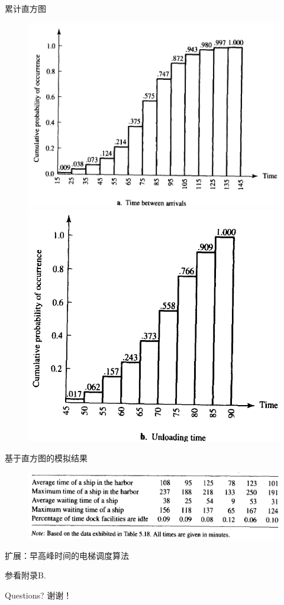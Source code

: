\documentclass[mathserif, table]{beamer}
\begin{document}
\begin{frame}{累计直方图}

  \begin{figure}
    \centering
    \includegraphics[height=.5\textheight{}]{harbor-arrive.png}
    \includegraphics[height=.5\textheight{}]{harbor-unload.png}
  \end{figure}
  
\end{frame}

\begin{frame}{基于直方图的模拟结果}
  \begin{figure}
    \centering
    \includegraphics[width=.8\textwidth{}]{harbor-sim-real.png}
  \end{figure}
  
\end{frame}

\begin{frame}{扩展：早高峰时间的电梯调度算法}

参看附录B.
  
\end{frame}

\begin{frame}
  Questions?
  谢谢！
\end{frame}
\end{document}
